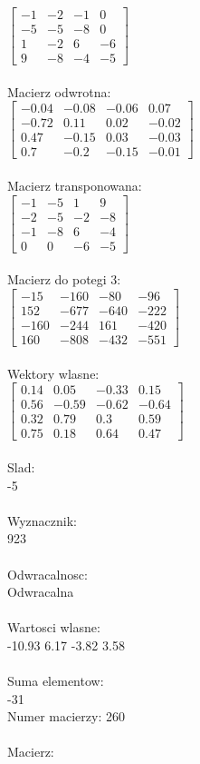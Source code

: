 \documentclass[a4paper,12pt]{article}
\begin{document}
$\begin{bmatrix} -1&-2&-1&0\\-5&-5&-8&0\\1&-2&6&-6\\9&-8&-4&-5 \end{bmatrix}$
\\
\\
Macierz odwrotna:\\

$\begin{bmatrix} -0.04&-0.08&-0.06&0.07\\-0.72&0.11&0.02&-0.02\\0.47&-0.15&0.03&-0.03\\0.7&-0.2&-0.15&-0.01 \end{bmatrix}$
\\
\\
Macierz transponowana:\\

$\begin{bmatrix} -1&-5&1&9\\-2&-5&-2&-8\\-1&-8&6&-4\\0&0&-6&-5 \end{bmatrix}$
\\
\\
Macierz do potegi 3:\\

$\begin{bmatrix} -15&-160&-80&-96\\152&-677&-640&-222\\-160&-244&161&-420\\160&-808&-432&-551 \end{bmatrix}$
\\
\\
Wektory wlasne:\\

$\begin{bmatrix} 0.14&0.05&-0.33&0.15\\0.56&-0.59&-0.62&-0.64\\0.32&0.79&0.3&0.59\\0.75&0.18&0.64&0.47 \end{bmatrix}$
\\
\\
Slad:\\
-5
\\
\\
Wyznacznik:\\
923
\\
\\
Odwracalnosc:\\
Odwracalna
\\
\\
Wartosci wlasne:\\
-10.93 6.17 -3.82 3.58
\\
\\
Suma elementow:\\
-31
\\
\newpage
Numer macierzy:
260
\\
\\
Macierz:\\
\end{document}
